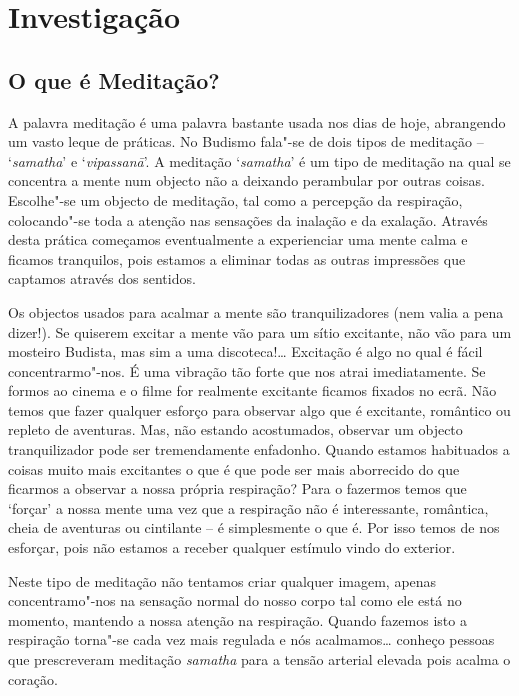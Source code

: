 \part{Investigação}

\chapter{O que é Meditação?}

A palavra meditação é uma palavra bastante usada nos dias de hoje,
abrangendo um vasto leque de práticas. No Budismo fala"-se de dois tipos
de meditação -- `\emph{samatha}' e `\emph{vipassanā}'. A meditação
`\emph{samatha}' é um tipo de meditação na qual se concentra a mente num
objecto não a deixando perambular por outras coisas. Escolhe"-se um
objecto de meditação, tal como a percepção da respiração, colocando"-se
toda a atenção nas sensações da inalação e da exalação. Através desta
prática começamos eventualmente a experienciar uma mente calma e ficamos
tranquilos, pois estamos a eliminar todas as outras impressões que
captamos através dos sentidos.

Os objectos usados para acalmar a mente são tranquilizadores (nem valia
a pena dizer!). Se quiserem excitar a mente vão para um sítio excitante,
não vão para um mosteiro Budista, mas sim a uma discoteca!\ldots{} Excitação
é algo no qual é fácil concentrarmo"-nos. É uma vibração tão forte que
nos atrai imediatamente. Se formos ao cinema e o filme for realmente
excitante ficamos fixados no ecrã. Não temos que fazer qualquer esforço
para observar algo que é excitante, romântico ou repleto de aventuras.
Mas, não estando acostumados, observar um objecto tranquilizador pode
ser tremendamente enfadonho. Quando estamos habituados a coisas muito
mais excitantes o que é que pode ser mais aborrecido do que ficarmos a
observar a nossa própria respiração? Para o
fazermos temos que `forçar' a nossa mente uma vez que a respiração não é
interessante, romântica, cheia de aventuras ou cintilante -- é
simplesmente o que é. Por isso temos de nos esforçar, pois não estamos a
receber qualquer estímulo vindo do exterior.

Neste tipo de meditação não tentamos criar qualquer imagem, apenas
concentramo"-nos na sensação normal do nosso corpo tal como ele está no
momento, mantendo a nossa atenção na respiração. Quando fazemos isto a
respiração torna"-se cada vez mais regulada e nós acalmamos\ldots{}
conheço pessoas que prescreveram meditação \emph{samatha} para a tensão
arterial elevada pois acalma o coração.

